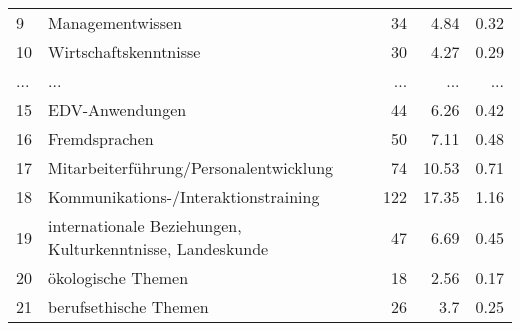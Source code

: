 \begin{longtable}{lXrrr}
        9 & \multicolumn{1}{X}{Managementwissen} & %
          \num{34} &
          \num[round-mode=places,round-precision=2]{4.84} &
          \num[round-mode=places,round-precision=2]{0.32} \\
        10 & \multicolumn{1}{X}{Wirtschaftskenntnisse} & %
          \num{30} &
          \num[round-mode=places,round-precision=2]{4.27} &
          \num[round-mode=places,round-precision=2]{0.29} \\
       ... & ... & ... & ... & ... \\
        15 & \multicolumn{1}{X}{EDV-Anwendungen} & %
          \num{44} &
          \num[round-mode=places,round-precision=2]{6.26} &
          \num[round-mode=places,round-precision=2]{0.42} \\

        16 & \multicolumn{1}{X}{Fremdsprachen} & %
          \num{50} &
          \num[round-mode=places,round-precision=2]{7.11} &
          \num[round-mode=places,round-precision=2]{0.48} \\

        17 & \multicolumn{1}{X}{Mitarbeiterführung/Personalentwicklung} & %
          \num{74} &
          \num[round-mode=places,round-precision=2]{10.53} &
          \num[round-mode=places,round-precision=2]{0.71} \\

        18 & \multicolumn{1}{X}{Kommunikations-/Interaktionstraining} & %
          \num{122} &
          \num[round-mode=places,round-precision=2]{17.35} &
          \num[round-mode=places,round-precision=2]{1.16} \\

        19 & \multicolumn{1}{X}{internationale Beziehungen, Kulturkenntnisse, Landeskunde} & %
          \num{47} &
          \num[round-mode=places,round-precision=2]{6.69} &
          \num[round-mode=places,round-precision=2]{0.45} \\

        20 & \multicolumn{1}{X}{ökologische Themen} & %
          \num{18} &
          \num[round-mode=places,round-precision=2]{2.56} &
          \num[round-mode=places,round-precision=2]{0.17} \\

        21 & \multicolumn{1}{X}{berufsethische Themen} & %
          \num{26} &
          \num[round-mode=places,round-precision=2]{3.7} &
          \num[round-mode=places,round-precision=2]{0.25} \\


\end{longtable}
